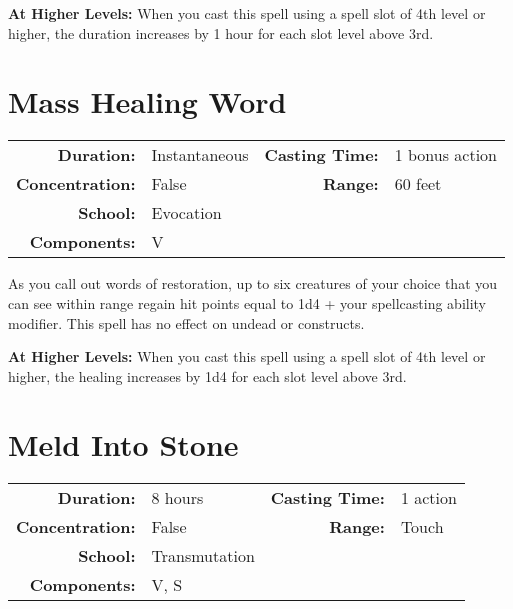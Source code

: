 \documentclass[a5paper, 12pt]{memoir}
\begin{document}
\vspace{8pt} \noindent\textbf{At Higher Levels:} When you cast this spell using a spell slot of 4th level or higher, the duration increases by 1 hour for each slot level above 3rd.
\newpage
\section*{Mass Healing Word}

{
\small\centering\vspace{-6pt}
\begin{tabular}{rlrl}
\toprule

\textbf{Duration:} & Instantaneous &
\textbf{Casting Time:} & 1 bonus action \\
\textbf{Concentration:} & False &
\textbf{Range:} & 60 feet \\
\textbf{School:} & Evocation \\
\textbf{Components:} & \multicolumn{3}{p{0.7\textwidth}}{V}\\

\bottomrule
\end{tabular}
}

\vspace{1\baselineskip}\noindent As you call out words of restoration, up to six creatures of your choice that you can see within range regain hit points equal to 1d4 + your spellcasting ability modifier. This spell has no effect on undead or constructs.

\vspace{8pt} \noindent\textbf{At Higher Levels:} When you cast this spell using a spell slot of 4th level or higher, the healing increases by 1d4 for each slot level above 3rd.
\newpage
\section*{Meld Into Stone}

{
\small\centering\vspace{-6pt}
\begin{tabular}{rlrl}
\toprule

\textbf{Duration:} & 8 hours &
\textbf{Casting Time:} & 1 action \\
\textbf{Concentration:} & False &
\textbf{Range:} & Touch \\
\textbf{School:} & Transmutation \\
\textbf{Components:} & \multicolumn{3}{p{0.7\textwidth}}{V, S}\\

\bottomrule
\end{tabular}
}
\end{document}
